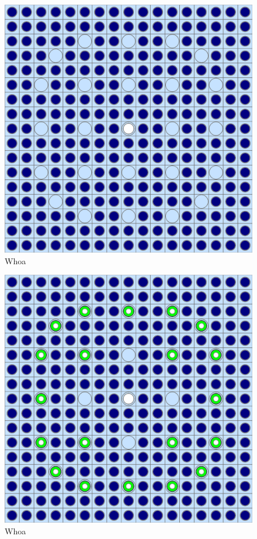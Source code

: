 
\begin{figure}[h!]
  \centering
  \includegraphics[width=0.65\linewidth]{figures/benchmarks/assembly-31}
\caption[BEAVRS 3.1\% enriched assembly]{Whoa}
\label{fig:chap7-assm-31}
\end{figure}

\begin{figure}[h!]
  \centering
  \includegraphics[width=0.65\linewidth]{figures/benchmarks/assembly-31-20BAs}
\caption[BEAVRS 3.1\% enriched assembly with burnable absorbers]{Whoa}
\label{fig:chap7-assm-31-20BAs}
\end{figure}

